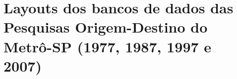 \chapter{Layouts dos bancos de dados das Pesquisas Origem-Destino do Metrô-SP (1977, 1987, 1997 e 2007)}\label{chap:anexo_layouts}




%


